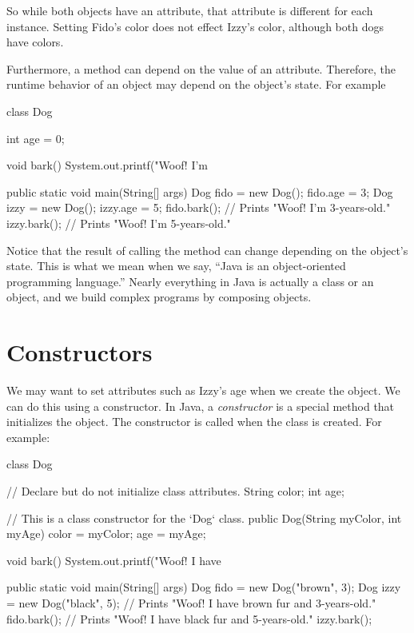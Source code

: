 So while both  objects have an  attribute, that attribute is different for each instance. Setting Fido's color does not effect Izzy's color, although both dogs have colors.

Furthermore, a method can depend on the value of an attribute. Therefore, the runtime behavior of an object may depend on the object's state. For example

\begin{code}
class Dog {

    int age = 0;
    
    void bark() {
        System.out.printf("Woof! I'm %
    }
    
    public static void main(String[] args) {
        Dog fido = new Dog();
        fido.age = 3;
        Dog izzy = new Dog();
        izzy.age = 5;
        fido.bark();  // Prints "Woof! I'm 3-years-old."
        izzy.bark();  // Prints "Woof! I'm 5-years-old."
    }
}
\end{code}

Notice that the result of calling the method  can change depending on the object's state.  This is what we mean when we say, ``Java is an object-oriented programming language.'' Nearly everything in Java is actually a class or an object, and we build complex programs by composing objects.

\section{Constructors}

We may want to set attributes such as Izzy's age when we create the object. We can do this using a constructor. In Java, a \emph{constructor} is a special method that initializes the object. The constructor is called when the class is created. For example:

\begin{code}
class Dog {

    // Declare but do not initialize class attributes.
    String color;
    int age;
    
    // This is a class constructor for the `Dog` class.
    public Dog(String myColor, int myAge) {
        color = myColor;
        age = myAge;
    }
    
    void bark() {
        System.out.printf("Woof! I have %
    }
    
    public static void main(String[] args) {
        Dog fido = new Dog("brown", 3);
        Dog izzy = new Dog("black", 5);
        // Prints "Woof! I have brown fur and 3-years-old."
        fido.bark();
        // Prints "Woof! I have black fur and 5-years-old."
        izzy.bark();
    }
}
\end{code}


